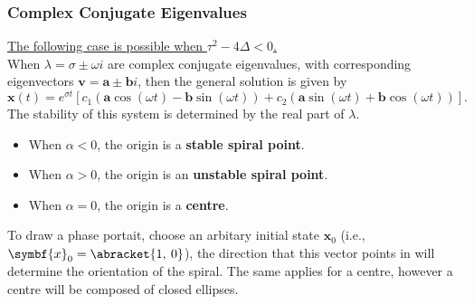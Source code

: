 \documentclass{article}
\begin{document}
\subsubsection{Complex Conjugate Eigenvalues}
\underline{The following case is possible when \(\tau^2 - 4\Delta < 0\).} \\[1em]
When \(\lambda = \sigma \pm \omega i\) are complex conjugate eigenvalues,
with corresponding eigenvectors \(\symbf{v} = \symbf{a} \pm \symbf{b} i\), then the general solution is given by
\begin{equation*}
    \symbf{x}\left( t \right) = e^{\sigma t} \left[ c_1 \left( \symbf{a} \cos{\left( \omega t \right)} - \symbf{b} \sin{\left( \omega t \right)} \right) + c_2 \left( \symbf{a} \sin{\left( \omega t \right)} + \symbf{b} \cos{\left( \omega t \right)} \right) \right].
\end{equation*}
The stability of this system is determined by the real part of \(\lambda\).
\begin{itemize}
    \item When \(\alpha < 0\), the origin is a \textbf{stable spiral point}.
    \item When \(\alpha > 0\), the origin is an \textbf{unstable spiral point}.
    \item When \(\alpha = 0\), the origin is a \textbf{centre}.
\end{itemize}
To draw a phase portait, choose an arbitary initial state \(\symbf{x}_0\) (i.e., \(\symbf{x}_0 = \abracket{1,\: 0}\)),
the direction that this vector points in will determine the orientation of the spiral. The same applies for a centre,
however a centre will be composed of closed ellipses.
\end{document}
